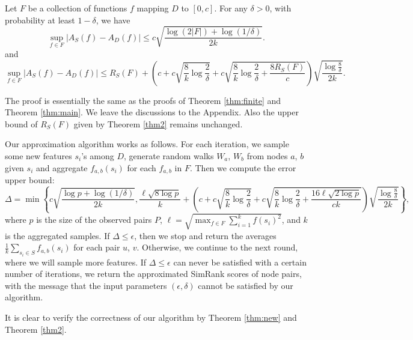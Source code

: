 \documentclass{article}
\begin{document}
\begin{theorem}
\label{thm:new}
Let $F$ be a collection of functions $f$ mapping $D$ to $[0,c]$. 
For any $\delta>0$, with probability at least $1-\delta$, we have
$$\sup_{f\in F} | A_S(f) - A_D(f) | \leq c\sqrt{\frac{\log(2|F|) + \log(1/\delta)}{2k}}.$$
and 
$$\sup_{f\in F}|A_S(f) - A_D(f)| \leq R_S(F) + \left(c+c\sqrt{\frac{8}{k}\log \frac{2}{\delta}} + c\sqrt{\frac{8}{k}\log \frac{2}{\delta} + \frac{8R_S(F)}{c}}\right)\sqrt{\frac{\log \frac{8}{\delta}}{2k}}.$$
\end{theorem}
The proof is essentially the same as the proofs of Theorem \ref{thm:finite} and Theorem \ref{thm:main}. We leave the discussions to the Appendix. Also the upper bound of $R_S(F)$ given by Theorem \ref{thm2} remains unchanged.

Our approximation algorithm works as follows. For each iteration, we sample some new features $s_i$'s among $D$, generate random walks $W_a$, $W_b$ from nodes $a$, $b$ given $s_i$ and aggregate $f_{a,b}(s_i)$ for each $f_{a,b}$ in $F$. Then we compute the error upper bound:
$$\Delta = \min\left\{c\sqrt{\frac{\log p + \log(1/\delta)}{2k}}, \frac{\ell\sqrt{8\log p}}{k} +\left(c+c\sqrt{\frac{8}{k}\log \frac{2}{\delta}} + c\sqrt{\frac{8}{k}\log \frac{2}{\delta} + \frac{16\ell\sqrt{2\log p}}{ck}}\right)\sqrt{\frac{\log \frac{8}{\delta}}{2k}}\right\},$$
where $p$ is the size of the observed pairs $P$, $\ell = \sqrt{\max_{f\in F} \sum_{i=1}^k f(s_i)^2}$, and $k$ is the aggregated samples. 
If $\Delta \leq \epsilon$, then we stop and return the averages $\frac{1}{k}\sum_{s_i\in S}f_{a,b}(s_i)$ for each pair $u$, $v$. Otherwise, we continue to the next round, where we will sample more features. If $\Delta \leq \epsilon$ can never be satisfied with a certain number of iterations, we return the approximated SimRank scores of node pairs, with the message that the input parameters $(\epsilon,\delta)$ cannot be satisfied by our algorithm.

It is clear to verify the correctness of our algorithm by Theorem \ref{thm:new} and Theorem \ref{thm2}.
\end{document}
